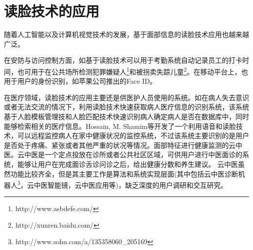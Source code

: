 

\section{读脸技术的应用}

随着人工智能以及计算机视觉技术的发展，基于面部信息的读脸技术应用也越来越广泛。

在安防与访问控制方面，如基于读脸技术可以用于考勤系统自动记录员工的打卡时间\cite{patel2014development}，也可用于在公共场所检测犯罪嫌疑人\footnote{http://www.asbdefe.com/}和被拐卖失踪儿童\footnote{http://xunren.baidu.com/}。在移动平台上，也用于用户的身份识别，如苹果公司推出的Face ID。

在医疗领域，读脸技术的应用主要还是供医护人员使用的系统。如在病人失去意识或者无法交流的情况下，利用读脸技术快速获取病人医疗信息的识别系统\cite{nwosu2016mobile}，该系统基于人脸模板管理技和人脸匹配技术快速识别病人确定病人是否在数据库中，同时能够检索相关的医疗信息。Hossain, M. Shamim等\cite{Hossain2015Cloud}开发了一个利用语音和读脸技术，可以远程监控病人在家中健康状况的监控系统，不过该系统主要识别的是用户是否处于疼痛、紧张或者其他严重的状况等情况。面部特征进行健康监测的云中医\cite{Zhang2018Study}。云中医是一个定点投放在诊所或者公共社区区域，可供用户进行中医面诊的系统，能够让用户在完成面诊舌诊问诊之后，给出健康分数和养生建议。
云中医虽然功能比较齐全，但是其主要工作是算法和系统实现层面(其中包括云中医诊断机器人\footnote{http://www.sohu.com/a/135358060_205169}，云中医智能镜\cite{李雪2016}，云中医应用\cite{钱鹏基于云中医的健康监测方法及系统}等)，缺乏深度的用户调研和交互研究。

